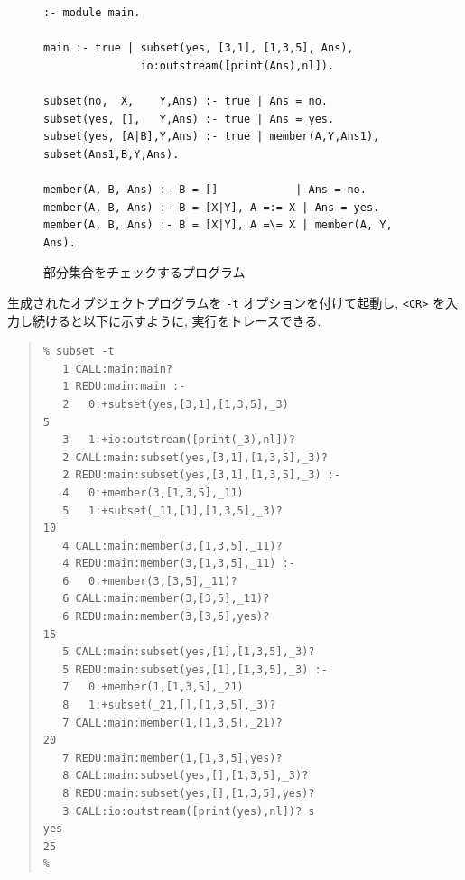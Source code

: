 \documentclass[a4,titlepage]{jsreport}
\begin{document}
\begin{figure}[htb]
\begin{Verbatim}[frame=single,baselinestretch=0.8]
:- module main.

main :- true | subset(yes, [3,1], [1,3,5], Ans), 
               io:outstream([print(Ans),nl]).

subset(no,  X,    Y,Ans) :- true | Ans = no.
subset(yes, [],   Y,Ans) :- true | Ans = yes.
subset(yes, [A|B],Y,Ans) :- true | member(A,Y,Ans1), subset(Ans1,B,Y,Ans).

member(A, B, Ans) :- B = []            | Ans = no.
member(A, B, Ans) :- B = [X|Y], A =:= X | Ans = yes.
member(A, B, Ans) :- B = [X|Y], A =\= X | member(A, Y, Ans).
\end{Verbatim}
\caption{部分集合をチェックするプログラム}
\label{sample-pro1}
\end{figure}

%
生成されたオブジェクトプログラムを {\tt -t} オプションを付けて起動し,
{\tt <CR>} を入力し続けると以下に示すように, 実行をトレースできる.  

\begin{quote}
\begin{Verbatim}[frame=single,baselinestretch=0.8]
% klic -o subset subset.kl1                                            1
% subset -t
   1 CALL:main:main? 							 
   1 REDU:main:main :-
   2   0:+subset(yes,[3,1],[1,3,5],_3)                                 5
   3   1:+io:outstream([print(_3),nl])? 
   2 CALL:main:subset(yes,[3,1],[1,3,5],_3)? 
   2 REDU:main:subset(yes,[3,1],[1,3,5],_3) :-
   4   0:+member(3,[1,3,5],_11)
   5   1:+subset(_11,[1],[1,3,5],_3)?                                 10
   4 CALL:main:member(3,[1,3,5],_11)? 
   4 REDU:main:member(3,[1,3,5],_11) :-
   6   0:+member(3,[3,5],_11)? 
   6 CALL:main:member(3,[3,5],_11)? 
   6 REDU:main:member(3,[3,5],yes)?                                   15
   5 CALL:main:subset(yes,[1],[1,3,5],_3)? 
   5 REDU:main:subset(yes,[1],[1,3,5],_3) :-
   7   0:+member(1,[1,3,5],_21)	
   8   1:+subset(_21,[],[1,3,5],_3)? 
   7 CALL:main:member(1,[1,3,5],_21)?                                 20
   7 REDU:main:member(1,[1,3,5],yes)? 
   8 CALL:main:subset(yes,[],[1,3,5],_3)? 
   8 REDU:main:subset(yes,[],[1,3,5],yes)? 
   3 CALL:io:outstream([print(yes),nl])? s
yes                                                                   25
% 
\end{Verbatim}
\end{quote}
\end{document}
